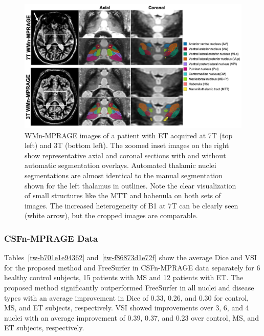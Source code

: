 \bgroup
{}
\begin{figure}[!htbp]
\centering \includegraphics{Thalamus/images/slide4.jpeg}
\makeatother 
\caption{WMn-MPRAGE images of a patient with ET acquired at 7T (top left) and 3T (bottom left). The zoomed inset images on the right show representative axial and coronal sections with and without automatic segmentation overlays. Automated thalamic nuclei segmentations are almost identical to the manual segmentation shown for the left thalamus in outlines. Note the clear visualization of small structures like the MTT and habenula on both sets of images. The increased heterogeneity of B1 at 7T can be clearly seen (white arrow), but the cropped images are comparable. }
\label{f-4d03d5d032a5}
\end{figure}
\egroup




\subsubsection{CSFn-MPRAGE Data }Tables~\ref{tw-b701e1e94362} and~\ref{tw-f86873d1e72f} show the average Dice and VSI for the proposed method and FreeSurfer in CSFn-MPRAGE data separately for 6 healthy control subjects, 15 patients with MS and 12 patients with ET. The proposed method significantly outperformed FreeSurfer in all nuclei and disease types with an average improvement in Dice of 0.33, 0.26, and 0.30 for control, MS, and ET subjects, respectively. VSI showed improvements over 3, 6, and 4 nuclei with an average improvement of 0.39, 0.37, and 0.23 over control, MS, and ET subjects, respectively.


